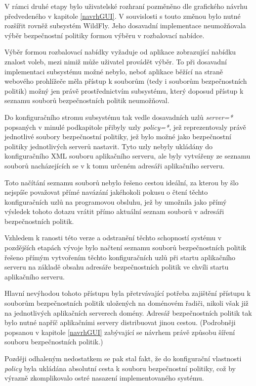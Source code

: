 V rámci druhé etapy bylo uživatelské rozhraní pozměněno dle grafického návrhu předvedeného v kapitole \ref{navrhGUI}. V souvislosti s touto změnou bylo nutné rozšířit rovněž subsystém WildFly. Jeho dosavadní implementace neumožňovala výběr bezpečnostní politiky formou výběru v rozbalovací nabídce.

Výběr formou rozbalovací nabídky vyžaduje od aplikace zobrazující nabídku znalost voleb, mezi nimiž může uživatel provádět výběr. To při dosavadní implementaci subsystému možné nebylo, neboť aplikace běžící na straně webového prohlížeče měla přístup k souborům (tedy i souborům bezpečnostních politik) možný jen právě prostřednictvím subsystému, který doposud přístup k seznamu souborů bezpečnostních politik neumožňoval.

Do konfiguračního stromu subsystému tak vedle dosavadních uzlů {\it server=*} popsaných v minulé podkapitole přibyly uzly {\it policy=*}, jež reprezentovaly právě jednotlivé soubory bezpečnostní politiky, jež bylo možné jako bezpečnostní politiky jednotlivých serverů nastavit. Tyto uzly nebyly ukládány do konfiguračního XML souboru aplikačního serveru, ale byly vytvářeny ze seznamu souborů nacházejících se v k tomu určeném adresáři aplikačního serveru.

Toto načítání seznamu souborů nebylo řešeno cestou ideální, za kterou by šlo nejspíše považovat přímé navázání jakéhokoli pokusu o čtení těchto konfiguračních uzlů na programovou obsluhu, jež by umožnila jako přímý výsledek tohoto dotazu vrátit přímo aktuální seznam souborů v adresáři bezpečnostních politik.

Vzhledem k ranosti této verze a odstranění těchto schopností systému v pozdějších etapách vývoje bylo načtení seznamu souborů bezpečnostních politik řešeno přímým vytvořením těchto konfiguračních uzlů při startu aplikačního serveru na základě obsahu adresáře bezpečnostních politik ve chvíli startu aplikačního serveru.

Hlavní nevýhodou tohoto přístupu byla přetrvávající potřeba zajištění přístupu k souborům bezpečnostních politik uložených na doménovém řadiči, nikoli však již na jednotlivých aplikačních serverech domény. Adresář bezpečnostních politik tak bylo nutné napříč aplikačními servery distribuovat jinou cestou. (Podrobněji popsanou v kapitole \ref{navrhGUI} zabývající se návrhem právě způsobu šíření souboru bezpečnostních politik.)

Později odhaleným nedostatkem se pak stal fakt, že do konfigurační vlastnosti {\it policy} byla ukládána absolutní cesta k souboru bezpečnostní politiky, což by výrazně zkomplikovalo ostré nasazení implementovaného systému.

